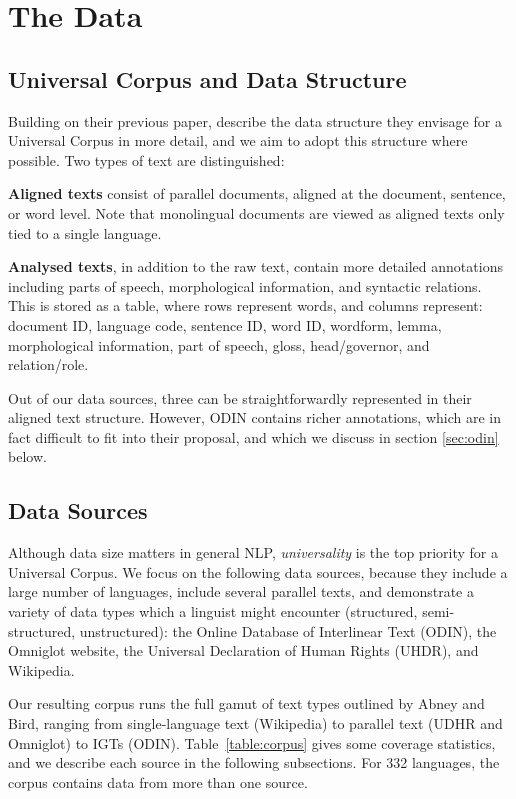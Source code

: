 \section{The Data}\label{sec:data}



\subsection{Universal Corpus and Data Structure} \label{sec:structure}

Building on their previous paper,  describe the data structure they envisage for a Universal Corpus in more detail, and we aim to adopt this structure where possible.  Two types of text are distinguished:

\textbf{Aligned texts} consist of parallel documents, aligned at the document, sentence, or word level. Note that monolingual documents are viewed as aligned texts only tied to a single language.

\textbf{Analysed texts}, in addition to the raw text, contain more detailed annotations including parts of speech, morphological information, and syntactic relations.  This is stored as a table, where rows represent words, and columns represent: document ID, language code, sentence ID, word ID, wordform, lemma, morphological information, part of speech, gloss, head/governor, and relation/role.

Out of our data sources, three can be straightforwardly represented in their aligned text structure. However, ODIN contains richer annotations, which are in fact difficult to fit into their proposal, and which we discuss in section \ref{sec:odin} below.


\subsection{Data Sources} \label{sec:sources}

Although data size matters in general NLP, \emph{universality} is the top priority for a Universal Corpus. We focus on the following data sources, because they include a large number of languages, include several parallel texts, and demonstrate a variety of data types which a linguist might encounter (structured, semi-structured, unstructured): the Online Database of Interlinear Text (ODIN), the Omniglot website, the Universal Declaration of Human Rights (UHDR), and Wikipedia.

Our resulting corpus runs the full gamut of text types outlined by Abney and Bird, ranging from single-language text (Wikipedia) to parallel text (UDHR and Omniglot) to IGTs (ODIN). Table~\ref{table:corpus} gives some coverage statistics, and we describe each source in the following subsections.  For 332 languages, the corpus contains data from more than one source.


